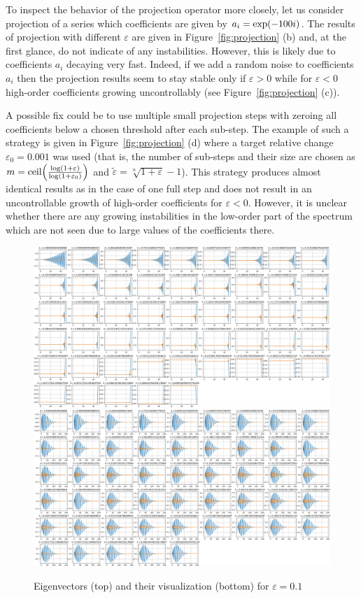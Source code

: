 \documentclass{article}
\begin{document}
To inspect the behavior of the projection operator more closely, let us consider projection of a series which coefficients are given by $a_i = \exp\of{-100i}$. The results of projection with different $\varepsilon$ are given in Figure~\ref{fig:projection} (b) and, at the first glance, do not indicate of any instabilities. However, this is likely due to coefficients $a_i$ decaying very fast. Indeed, if we add a random noise to coefficients $a_i$ then the projection results seem to stay stable only if $\varepsilon > 0$ while for $\varepsilon < 0$ high-order coefficients growing uncontrollably (see Figure~\ref{fig:projection} (c)). 

A possible fix could be to use multiple small projection steps with zeroing all coefficients below a chosen threshold after each sub-step. The example of such a strategy is given in  Figure~\ref{fig:projection} (d) where a target relative change $\varepsilon_0 = 0.001$ was used (that is, the number of sub-steps and their size are chosen as $m = \text{ceil}\of{\frac{\log\of{1+\varepsilon}}{\log\of{1+\varepsilon_0}}}$ and $\tilde{\varepsilon} = \sqrt[n]{1+\varepsilon} - 1$). This strategy produces almost identical results as in the case of one full step and does not result in an uncontrollable growth of high-order coefficients for $\varepsilon < 0$. However, it is unclear whether there are any growing instabilities in the low-order part of the spectrum which are not seen due to large values of the coefficients there.


\begin{figure}[H]
\centering
\includegraphics[width=1.2\textwidth]{dat/projection_pos_eigs.png}
\includegraphics[width=1.2\textwidth]{dat/projection_pos_eigs_visual.png}
\caption{Eigenvectors (top) and their visualization (bottom) for $\varepsilon = 0.1$}
\end{figure}
\end{document}
